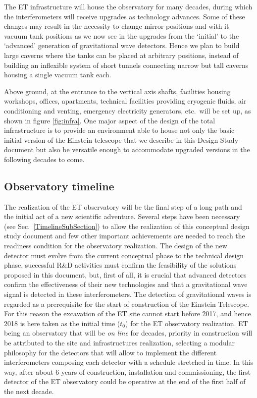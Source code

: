 The ET infrastructure will house the observatory for many decades, during which the interferometers will receive upgrades as technology advances. Some of these changes may result in the necessity to change mirror positions and with it vacuum tank positions as we now see in the upgrades from the `initial' to the `advanced' generation of gravitational wave detectors. Hence we plan to build large caverns where the tanks can be placed at arbitrary positions, instead of building an inflexible system of short tunnels connecting narrow but tall caverns housing a single vacuum tank each.  

Above ground, at the entrance to the vertical axis shafts, facilities housing workshops, offices, apartments, technical facilities providing cryogenic fluids, air conditioning and venting, emergency electricity generators, etc.\ will be set up, as shown in figure \ref{fig:infra}. 
One major aspect of the design of the total infrastructure is to provide an environment able to house not only the basic initial version of the Einstein telescope that we describe in this Design Study document but also be versatile enough to accommodate upgraded versions in the following decades to come.   
\FloatBarrier
\subsection{Observatory timeline}
The realization of the ET observatory will be the final step of a long path and the initial act of a new scientific adventure. Several steps have been necessary (see Sec.~\ref{TimelineSubSection}) to allow the realization of this conceptual design study document  and few other important achievements are needed to reach the readiness condition for the observatory realization. The design of the new detector must evolve from the current conceptual phase to the technical design phase, successful R\&D activities must confirm the feasibility of the solutions proposed in this document, but, first of all, it is crucial that advanced detectors confirm the effectiveness of their new technologies and that a gravitational wave signal is detected in these interferometers. 
The detection of gravitational waves is regarded as a prerequisite for the start of construction of the Einstein Telescope.
For this reason the excavation of the ET site cannot start before 2017, and hence 2018 is here taken as the initial time ($t_0$) for the ET observatory realization. ET being an observatory that will be \emph{on line} for decades, priority in construction will be attributed to the site and infrastructures realization, selecting a modular philosophy for the detectors that will allow to implement the different interferometers composing each detector with a schedule stretched in time. In this way, after about 6 years of construction, installation and commissioning, the first detector of the ET observatory could be operative at the end of the first half of the next decade.
\FloatBarrier
